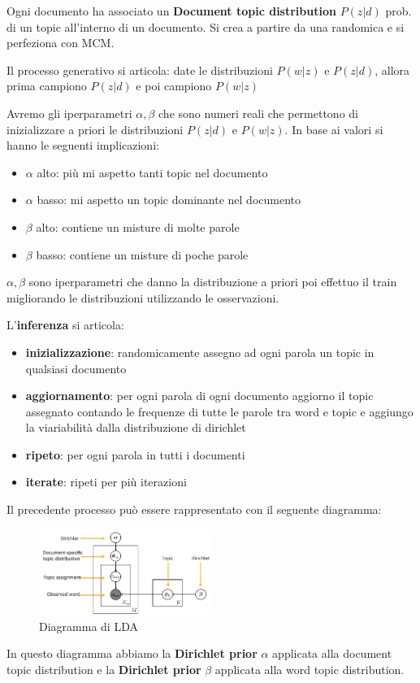 Ogni documento ha associato un \textbf{Document topic distribution} $P(z|d)$ prob. di un topic 
all'interno di un documento. Si crea a partire da una randomica e si perfeziona con
MCM.

Il processo generativo si articola: date le distribuzioni $P(w|z)$ e $P(z|d)$, allora prima campiono 
$P(z|d)$ e poi campiono $P(w|z)$

Avremo gli iperparametri $\alpha, \beta$ che sono numeri reali che permettono 
di inizializzare a priori le distribuzioni $P(z|d)$ e $P(w|z)$. In base ai valori 
si hanno le seguenti implicazioni:
\begin{itemize}
      \item $\alpha$ alto: più mi aspetto tanti topic nel documento
      \item $\alpha$ basso: mi aspetto un topic dominante nel documento
      \item $\beta$ alto: contiene un misture di molte parole
      \item $\beta$ basso: contiene un misture di poche parole
\end{itemize} 

$\alpha, \beta$ sono iperparametri che danno la distribuzione a priori poi effettuo 
il train migliorando le distribuzioni utilizzando le osservazioni. 

L'\textbf{inferenza} si articola:
\begin{itemize}
      \item \textbf{inizializzazione}: randomicamente assegno ad ogni parola un 
      topic in qualsiasi documento
      \item \textbf{aggiornamento}: per ogni parola di ogni documento aggiorno il 
      topic assegnato contando le frequenze di tutte le parole tra word e topic e 
      aggiungo la viariabilità dalla distribuzione di dirichlet
      \item \textbf{ripeto}: per ogni parola in tutti i documenti
      \item \textbf{iterate}: ripeti per più iterazioni
\end{itemize}
Il precedente processo può essere rappresentato con il seguente diagramma:
\begin{figure}[!ht]
      \centering
      \includegraphics[width=0.5\textwidth]{./img/nlp/lda.png}
      \caption{Diagramma di LDA}
      \label{fig:lda}
\end{figure}
In questo diagramma abbiamo la \textbf{Dirichlet prior} $\alpha$ applicata alla
document topic distribution e la \textbf{Dirichlet prior} $\beta$ applicata alla
word topic distribution.

